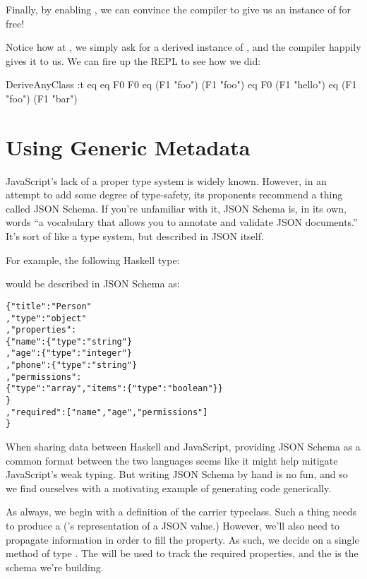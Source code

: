 \documentclass[book.tex]{subfiles}
\begin{document}
Finally, by enabling , we can convince the compiler to give
us an instance of  for free!


Notice how at , we simply ask for a derived instance of , and
the compiler happily gives it to us. We can fire up the REPL to see how we did:

\begin{dorepl}{DeriveAnyClass}
:t eq
eq F0 F0
eq (F1 "foo") (F1 "foo")
eq F0 (F1 "hello")
eq (F1 "foo") (F1 "bar")
\end{dorepl}


\section{Using Generic Metadata}


JavaScript's lack of a proper type system is widely known. However, in an
attempt to add some degree of type-safety, its proponents recommend a thing
called JSON Schema. If you're unfamiliar with it, JSON Schema is, in its own,
words ``a vocabulary that allows you to annotate and validate JSON documents.''
It's sort of like a type system, but described in JSON itself.

For example, the following Haskell type:


would be described in JSON Schema as:

\begin{alltt}
  \{ "title": "Person"
  , "type": "object"
  , "properties":
      \{ "name":  \{ "type": "string"  \}
      , "age":   \{ "type": "integer" \}
      , "phone": \{ "type": "string"  \}
      , "permissions":
          \{ "type": "array", "items": \{ "type": "boolean" \}\}
      \}
  , "required": ["name" , "age", "permissions"]
  \}
\end{alltt}

When sharing data between Haskell and JavaScript, providing JSON Schema as a
common format between the two languages seems like it might help mitigate
JavaScript's weak typing. But writing JSON Schema by hand is no fun, and so we
find ourselves with a motivating example of generating code generically.

As always, we begin with a definition of the carrier typeclass. Such a thing
needs to produce a  ('s \cite{aeson} representation of a
JSON value.) However, we'll also need to propagate information in order to fill
the  property. As such, we decide on a single method of type
. The \ty{[Text]} will be used to track the required
properties, and the  is the schema we're building.
\end{document}
